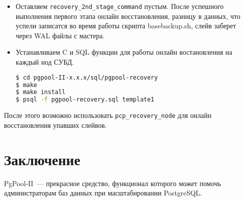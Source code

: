 \begin{itemize}
  \item Оставляем \lstinline!recovery_2nd_stage_command! пустым. После успешного выполнения первого этапа онлайн восстановления, разницу в данных, что успели записатся во время работы скрипта basebackup.sh, слейв заберет через WAL файлы с мастера.

  \item Устанавливаем C и SQL функции для работы онлайн востановления на каждый нод СУБД.

\begin{lstlisting}[language=Bash,label=lst:pgpool46,caption=Устанавливаем C и SQL функции]
$ cd pgpool-II-x.x.x/sql/pgpool-recovery
$ make
$ make install
$ psql -f pgpool-recovery.sql template1
\end{lstlisting}

\end{itemize}

После этого возможно использовать \lstinline!pcp_recovery_node! для онлайн восстановления упавших слейвов.


\section{Заключение}

PgPool-II~--- прекрасное средство, функционал которого может помочь администраторам баз данных при масштабировании PostgreSQL.
